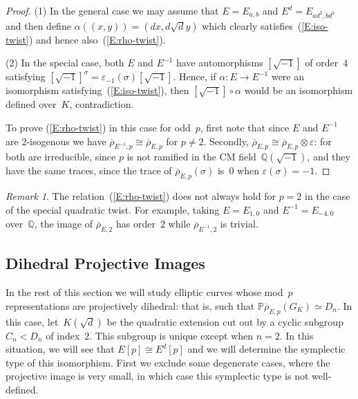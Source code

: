 \documentclass[12pt, reqno]{amsart}
\newcommand{\PP}{\mathbb{P}}
\newcommand{\Q}{\mathbb{Q}}
\newcommand{\rhobar}{{\overline{\rho}}}
\newcommand{\eps}{\varepsilon}
\numberwithin{equation}{section}
\theoremstyle{definition}
\theoremstyle{remark}
\newtheorem{remark}[theorem]{Remark}
\begin{document}
\begin{proof}
(1) In the general case we may assume that $E=E_{a,b}$ and
$E^d=E_{ad^2,bd^3}$ and then define $\alpha((x,y)) = (dx,d\sqrt{d}y)$
which clearly satisfies~(\ref{E:iso-twist}) and hence
also~(\ref{E:rho-twist}).

(2) In the special case, both $E$ and $E^{-1}$ have automorphisms
$[\sqrt{-1}]$ of order~$4$ satisfying
$[\sqrt{-1}]^\sigma=\eps_{-1}(\sigma)[\sqrt{-1}]$.  Hence, if
$\alpha:E\to E^{-1}$ were an isomorphism
satisfying~(\ref{E:iso-twist}), then $[\sqrt{-1}]\circ\alpha$ would be
an isomorphism defined over~$K$, contradiction.
\begin{comment}
  take $E=E_{a,0}$ and $E^{-1}=E_{-4a,0}$.  One
isomorphism $\alpha:E\to E^{-1}$ is given by $\alpha((x,y)) =
(2ix,(2-2i)y)$, where $i=\sqrt{-1}$.  One may check that when
$\eps(\sigma)=-1$ (that is, when $\sigma(i)=-i$) we have
$\alpha\circ\sigma=[i]\circ\sigma\circ\alpha$, where $[i]$ denotes the
automorphism of $E$ or $E^{-1}$ defined by $[i](x,y)=(-x,-iy)$,
satisfying $[i]^2=-1$ and $[i]\circ\sigma=\eps(\sigma)\sigma\circ[i]$.

Hence this isomorphism does not satisfy~(\ref{E:iso-twist}). The other
isomorphisms $E\to E^{-1}$ are obtained by composing $\alpha$ by one
of the four automorphisms of~$E^{-1}$, and none of these satisfy
(\ref{E:iso-twist}) either.
\end{comment}

To prove (\ref{E:rho-twist}) in this case for odd~$p$, first note that
since $E$ and $E^{-1}$ are $2$-isogenous we have $\rhobar_{E^{-1},p}
\cong \rhobar_{E,p}$ for $p\not=2$.  Secondly, $\rhobar_{E,p} \cong
\rhobar_{E,p}\otimes\eps$: for both are irreducible, since $p$ is not
ramified in the CM field~$\Q(\sqrt{-1})$, and they have the same
traces, since the trace of $\rhobar_{E,p}(\sigma)$ is~$0$ when
$\eps(\sigma)=-1$.
\end{proof}

\begin{remark}
The relation~(\ref{E:rho-twist}) does not always hold for $p=2$ in the
case of the special quadratic twist.  For example, taking $E=E_{1,0}$
and $E^{-1}=E_{-4,0}$ over~$\Q$, the image of $\rhobar_{E,2}$ has
order~$2$ while $\rhobar_{E^{-1},2}$ is trivial.
\end{remark}

\subsection{Dihedral Projective Images}
In the rest of this section we will study elliptic curves whose
mod~$p$ representations are projectively dihedral: that is, such that
$\PP \rhobar_{E,p} (G_K) \simeq D_{n}$.  In this case,
let~$K(\sqrt{d})$ be the quadratic extension cut out by a cyclic
subgroup~$C_n<D_n$ of index~$2$.  This subgroup is unique except when
$n=2$. In this situation, we will see that $E[p]\cong E^d[p]$ and we
will determine the symplectic type of this isomorphism.  First we
exclude some degenerate cases, where the projective image is very
small, in which case this symplectic type is not well-defined.
\end{document}
